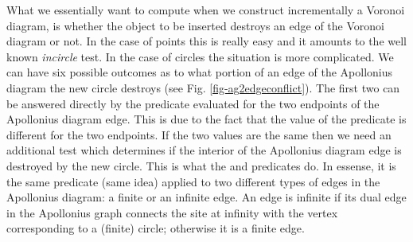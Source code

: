 {What we essentially want to compute when we construct incrementally a
Voronoi diagram, is whether the object to be inserted destroys an edge
of the Voronoi diagram or not. In the case of points this is really
easy and it amounts to the well known {\em incircle} test. 
In the case
of circles the situation is more complicated. We can have six possible
outcomes as to what portion of an edge of the Apollonius diagram the
new circle destroys (see Fig. \ref{fig-ag2edgeconflict}). The first
two can be answered directly by the  predicate
evaluated for the two endpoints of the Apollonius diagram edge. This
is due to the fact that the value of the 
predicate is different for the two endpoints. If the two values are
the same then we need an additional test which determines if the interior
of the Apollonius diagram edge is destroyed by the new circle. This is
what the  and
 predicates do. In essense, it
is the same predicate (same idea) applied to two different types of
edges in the Apollonius diagram: a finite or an infinite edge. An edge
is infinite if its dual edge in the Apollonius graph connects the
site at infinity with the vertex corresponding to a (finite) circle; 
otherwise it is a finite edge.

}
